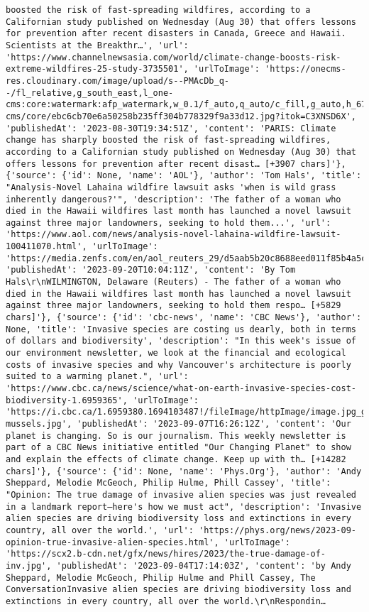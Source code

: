 \documentclass[
  letterpaper,
  DIV=11,
  numbers=noendperiod]{scrartcl}
\begin{document}
\begin{verbatim}
boosted the risk of fast-spreading wildfires, according to a Californian study published on Wednesday (Aug 30) that offers lessons for prevention after recent disasters in Canada, Greece and Hawaii. Scientists at the Breakthr…', 'url': 'https://www.channelnewsasia.com/world/climate-change-boosts-risk-extreme-wildfires-25-study-3735501', 'urlToImage': 'https://onecms-res.cloudinary.com/image/upload/s--PMAcDb_q--/fl_relative,g_south_east,l_one-cms:core:watermark:afp_watermark,w_0.1/f_auto,q_auto/c_fill,g_auto,h_676,w_1200/v1/one-cms/core/ebc6cb70e6a50258b235ff304b778329f9a33d12.jpg?itok=C3XNSD6X', 'publishedAt': '2023-08-30T19:34:51Z', 'content': 'PARIS: Climate change has sharply boosted the risk of fast-spreading wildfires, according to a Californian study published on Wednesday (Aug 30) that offers lessons for prevention after recent disast… [+3907 chars]'}, {'source': {'id': None, 'name': 'AOL'}, 'author': 'Tom Hals', 'title': "Analysis-Novel Lahaina wildfire lawsuit asks 'when is wild grass inherently dangerous?'", 'description': 'The father of a woman who died in the Hawaii wildfires last month has launched a novel lawsuit against three major landowners, seeking to hold them...', 'url': 'https://www.aol.com/news/analysis-novel-lahaina-wildfire-lawsuit-100411070.html', 'urlToImage': 'https://media.zenfs.com/en/aol_reuters_29/d5aab5b20c8688eed011f85b4a5cb484', 'publishedAt': '2023-09-20T10:04:11Z', 'content': 'By Tom Hals\r\nWILMINGTON, Delaware (Reuters) - The father of a woman who died in the Hawaii wildfires last month has launched a novel lawsuit against three major landowners, seeking to hold them respo… [+5829 chars]'}, {'source': {'id': 'cbc-news', 'name': 'CBC News'}, 'author': None, 'title': 'Invasive species are costing us dearly, both in terms of dollars and biodiversity', 'description': "In this week's issue of our environment newsletter, we look at the financial and ecological costs of invasive species and why Vancouver's architecture is poorly suited to a warming planet.", 'url': 'https://www.cbc.ca/news/science/what-on-earth-invasive-species-cost-biodiversity-1.6959365', 'urlToImage': 'https://i.cbc.ca/1.6959380.1694103487!/fileImage/httpImage/image.jpg_gen/derivatives/16x9_620/zebra-mussels.jpg', 'publishedAt': '2023-09-07T16:26:12Z', 'content': 'Our planet is changing. So is our journalism. This weekly newsletter is part of a CBC News initiative entitled "Our Changing Planet" to show and explain the effects of climate change. Keep up with th… [+14282 chars]'}, {'source': {'id': None, 'name': 'Phys.Org'}, 'author': 'Andy Sheppard, Melodie McGeoch, Philip Hulme, Phill Cassey', 'title': "Opinion: The true damage of invasive alien species was just revealed in a landmark report—here's how we must act", 'description': 'Invasive alien species are driving biodiversity loss and extinctions in every country, all over the world.', 'url': 'https://phys.org/news/2023-09-opinion-true-invasive-alien-species.html', 'urlToImage': 'https://scx2.b-cdn.net/gfx/news/hires/2023/the-true-damage-of-inv.jpg', 'publishedAt': '2023-09-04T17:14:03Z', 'content': 'by Andy Sheppard, Melodie McGeoch, Philip Hulme and Phill Cassey, The ConversationInvasive alien species are driving biodiversity loss and extinctions in every country, all over the world.\r\nRespondin… 
\end{verbatim}
\end{document}
